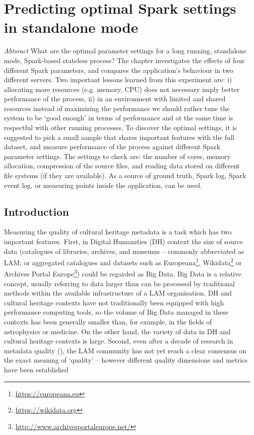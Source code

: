 \chapter{Predicting optimal Spark settings in standalone mode}

\emph{Abtsract} What are the optimal parameter settings for a long running, standalone mode, Spark-based stateless process? The chapter investigates the effects of four different Spark parameters, and compares the application's behaviour in two different servers. Two important lessons learned from this experiment are: i) allocating more resources (e.g. memory, CPU) does not necessary imply better performance of the process, ii) in an environment with limited and shared resources instead of maximizing the performance we should rather tune the system to be `good enough' in terms of performance and at the same time is respectful with other running processes. To discover the optimal settings, it is suggested to pick a small sample that shares important features with the full dataset, and measure performance of the process against different Spark parameter settings. The settings to check are: the number of cores, memory allocation, compression of the source files, and reading data stored on different file systems (if they are available). As a source of ground truth, Spark log, Spark event log, or measuring points inside the application, can be used.


\section{Introduction}
Measuring the quality of cultural heritage metadata is a task which has two important features. First, in Digital Humanities (DH) context the size of source data (catalogues of libraries, archives, and museums -- commonly abbreviated as LAM; or aggregated catalogues and datasets such as Europeana\footnote{\url{https://europeana.eu}}, Wikidata\footnote{\url{https://wikidata.org}} or Archives Portal Europe\footnote{\url{http://www.archivesportaleurope.net/}}) could be regarded as Big Data. Big Data is a relative concept, usually referring to data larger than can be processed by traditional methods within the available infrastructure of a LAM organisation. DH and cultural heritage contexts have not traditionally been equipped with high performance computing tools, so the volume of Big Data managed in these contexts has been generally smaller than, for example, in the fields of astrophysics or medicine. On the other hand, the variety of data in DH and cultural heritage contexts is large. Second, even after a decade of research in metadata quality (\cite{zotero-bibliography}), the LAM community has not yet reach a clear consensus on the exact meaning of `quality' -- however different quality dimensions and metrics have been established

